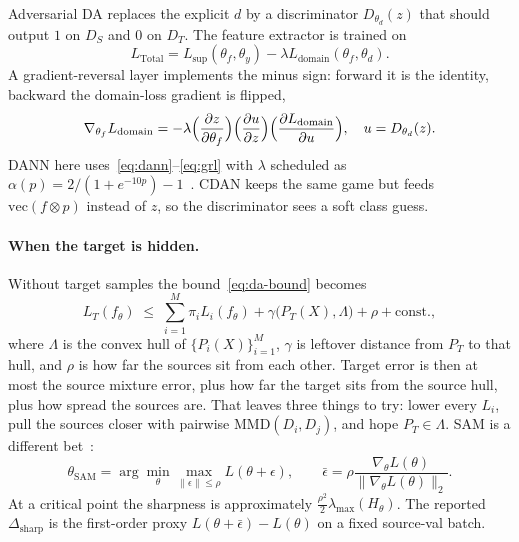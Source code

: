 \documentclass{article}
\begin{document}
Adversarial DA replaces the explicit $d$ by a discriminator $D_{\theta_d}(z)$ that should output $1$ on $D_S$ and $0$ on $D_T$.
The feature extractor is trained on
\begin{equation}
  L_{\mathrm{Total}}=L_{\mathrm{sup}}(\theta_f,\theta_y)-\lambda L_{\mathrm{domain}}(\theta_f,\theta_d).
  \label{eq:dann}
\end{equation}
A gradient-reversal layer implements the minus sign: forward it is the identity, backward the domain-loss gradient is flipped,
\begin{equation}
  \nabla_{\theta_f}L_{\mathrm{domain}}
  =-\lambda
  \Bigl(\frac{\partial z}{\partial\theta_f}\Bigr)
  \Bigl(\frac{\partial u}{\partial z}\Bigr)
  \Bigl(\frac{\partial L_{\mathrm{domain}}}{\partial u}\Bigr),
  \quad u=D_{\theta_d}(z).
  \label{eq:grl}
\end{equation}
DANN here uses~\eqref{eq:dann}--\eqref{eq:grl} with $\lambda$ scheduled as $\alpha(p)=2/(1+e^{-10p})-1$~\citep{ganin2016domain}.
CDAN keeps the same game but feeds $\mathrm{vec}(f\otimes p)$ instead of $z$, so the discriminator sees a soft class guess.

\paragraph{When the target is hidden.}
Without target samples the bound~\eqref{eq:da-bound} becomes
\begin{equation}
  L_T(f_\theta)
  \;\le\;
  \sum_{i=1}^{M}\pi_i L_i(f_\theta)
  +\gamma\big(P_T(X),\Lambda\big)
  +\rho
  +\mathrm{const.},
  \label{eq:dg-bound}
\end{equation}
where $\Lambda$ is the convex hull of $\{P_i(X)\}_{i=1}^M$, $\gamma$ is leftover distance from $P_T$ to that hull, and $\rho$ is how far the sources sit from each other.
Target error is then at most the source mixture error, plus how far the target sits from the source hull, plus how spread the sources are.
That leaves three things to try: lower every $L_i$, pull the sources closer with pairwise $\mathrm{MMD}(D_i,D_j)$, and hope $P_T\in\Lambda$.
SAM is a different bet~\citep{foret2021sharpness}:
\begin{equation}
  \theta_{\mathrm{SAM}}
  =\arg\min_\theta\max_{\|\epsilon\|\le\rho}L(\theta+\epsilon),
  \qquad
  \bar\epsilon=\rho\frac{\nabla_\theta L(\theta)}{\|\nabla_\theta L(\theta)\|_2}.
  \label{eq:sam}
\end{equation}
At a critical point the sharpness is approximately $\tfrac{\rho^2}{2}\lambda_{\max}(H_\theta)$.
The reported $\Delta_{\mathrm{sharp}}$ is the first-order proxy $L(\theta+\bar\epsilon)-L(\theta)$ on a fixed source-val batch.
\end{document}

